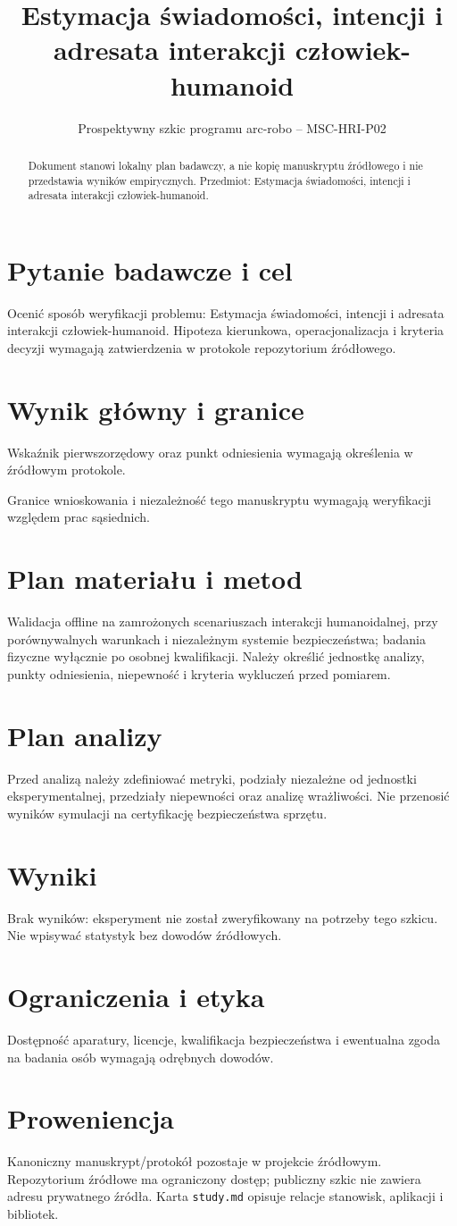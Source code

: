 \documentclass[11pt,a4paper]{article}
\title{Estymacja świadomości, intencji i adresata interakcji człowiek-humanoid}
\author{}
\date{Prospektywny szkic programu arc-robo -- MSC-HRI-P02}
\begin{document}
\maketitle
\begin{abstract}
Dokument stanowi lokalny plan badawczy, a nie kopię manuskryptu źródłowego i nie przedstawia wyników empirycznych. Przedmiot: Estymacja świadomości, intencji i adresata interakcji człowiek-humanoid.
\end{abstract}
\section{Pytanie badawcze i cel}
Ocenić sposób weryfikacji problemu: Estymacja świadomości, intencji i adresata interakcji człowiek-humanoid. Hipoteza kierunkowa, operacjonalizacja i kryteria decyzji wymagają zatwierdzenia w protokole repozytorium źródłowego.
\section{Wynik główny i granice}
Wskaźnik pierwszorzędowy oraz punkt odniesienia wymagają określenia w źródłowym protokole.

Granice wnioskowania i niezależność tego manuskryptu wymagają weryfikacji względem prac sąsiednich.
\section{Plan materiału i metod}
Walidacja offline na zamrożonych scenariuszach interakcji humanoidalnej, przy porównywalnych warunkach i niezależnym systemie bezpieczeństwa; badania fizyczne wyłącznie po osobnej kwalifikacji. Należy określić jednostkę analizy, punkty odniesienia, niepewność i kryteria wykluczeń przed pomiarem.
\section{Plan analizy}
Przed analizą należy zdefiniować metryki, podziały niezależne od jednostki eksperymentalnej, przedziały niepewności oraz analizę wrażliwości. Nie przenosić wyników symulacji na certyfikację bezpieczeństwa sprzętu.
\section{Wyniki}
Brak wyników: eksperyment nie został zweryfikowany na potrzeby tego szkicu. Nie wpisywać statystyk bez dowodów źródłowych.
\section{Ograniczenia i etyka}
Dostępność aparatury, licencje, kwalifikacja bezpieczeństwa i ewentualna zgoda na badania osób wymagają odrębnych dowodów.
\section{Proweniencja}
Kanoniczny manuskrypt/protokół pozostaje w projekcie źródłowym. Repozytorium źródłowe ma ograniczony dostęp; publiczny szkic nie zawiera adresu prywatnego źródła. Karta \texttt{study.md} opisuje relacje stanowisk, aplikacji i bibliotek.
\end{document}

